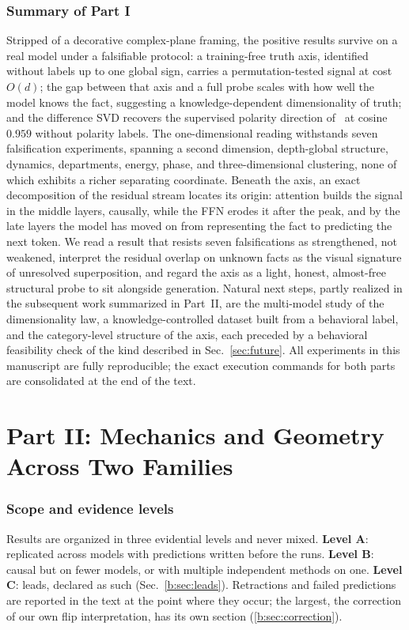 \documentclass[11pt]{article}
\begin{document}
\section{Summary of Part I}

Stripped of a decorative complex-plane framing, the positive results survive
on a real model under a falsifiable protocol: a training-free truth axis,
identified without labels up to one global sign, carries a permutation-tested
signal at cost $O(d)$; the gap between that axis and a full probe scales with
how well the model knows the fact, suggesting a knowledge-dependent
dimensionality of truth; and the difference SVD recovers the supervised
polarity direction of~\cite{burger2024} at cosine $0.959$ without polarity
labels. The one-dimensional reading withstands seven falsification
experiments, spanning a second dimension, depth-global structure, dynamics,
departments, energy, phase, and three-dimensional clustering, none of which
exhibits a richer separating coordinate. Beneath the axis, an exact
decomposition of the residual stream locates its origin: attention builds the
signal in the middle layers, causally, while the FFN erodes it after the
peak, and by the late layers the model has moved on from representing the
fact to predicting the next token. We read a result that resists seven
falsifications as strengthened, not weakened, interpret the residual overlap
on unknown facts as the visual signature of unresolved superposition, and
regard the axis as a light, honest, almost-free structural probe to sit
alongside generation. Natural next steps, partly realized in the subsequent
work summarized in Part~II, are the multi-model study
of the dimensionality law, a knowledge-controlled dataset built from a
behavioral label, and the category-level structure of the axis, each preceded
by a behavioral feasibility check of the kind described in
Sec.~\ref{sec:future}. All experiments in this manuscript are fully reproducible; the exact execution commands for both parts are consolidated at the end of the text.


\part*{Part II: Mechanics and Geometry Across Two Families}
\section{Scope and evidence levels}
\label{b:sec:scope}

Results are organized in three evidential levels and never mixed.
\textbf{Level A}: replicated across models with predictions written before
the runs. \textbf{Level B}: causal but on fewer models, or with multiple
independent methods on one. \textbf{Level C}: leads, declared as such
(Sec.~\ref{b:sec:leads}). Retractions and failed predictions are reported in
the text at the point where they occur; the largest, the correction of our
own flip interpretation, has its own section (\ref{b:sec:correction}).
\end{document}
